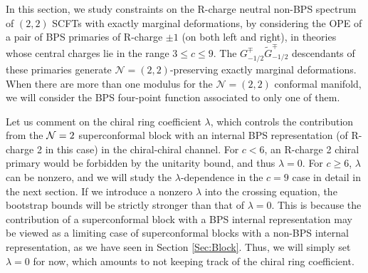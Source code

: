 \documentclass[12pt]{article}
\begin{document}
In this section, we study constraints on the R-charge neutral non-BPS spectrum of $(2,2)$ SCFTs with exactly marginal deformations, by considering the OPE of a pair of BPS primaries of R-charge $\pm 1$ (on both left and right), in theories whose central charges lie in the range $3\le c \le9$. The $G^\mp_{-1/2}\tilde G^\mp_{-1/2}$ descendants of these primaries generate $\mathcal{N}=(2, 2)$-preserving exactly marginal deformations.  When there are more than one modulus for the $\mathcal{N}=(2,2)$ conformal manifold, we will consider the BPS four-point function associated to only one of them.

Let us comment on the chiral ring coefficient $\lambda$, which controls the contribution from the ${\cal N}=2$ superconformal block with an internal BPS representation (of R-charge 2 in this case) in the chiral-chiral channel. For $c<6$, an R-charge 2 chiral primary would be forbidden by the unitarity bound, and thus $\lambda=0$. For $c\geq 6$, $\lambda$ can be nonzero, and we will study the $\lambda$-dependence in the $c=9$ case in detail in the next section. If we introduce a nonzero $\lambda$ into the crossing equation, the bootstrap bounds will be strictly stronger than that of $\lambda=0$. This is because the contribution of a superconformal block with a BPS internal representation may be viewed as a limiting case of superconformal blocks with a non-BPS internal representation, as we have seen in Section \ref{Sec:Block}. Thus, we will simply set $\lambda=0$ for now, which amounts to not keeping track of the chiral ring coefficient.
\end{document}
